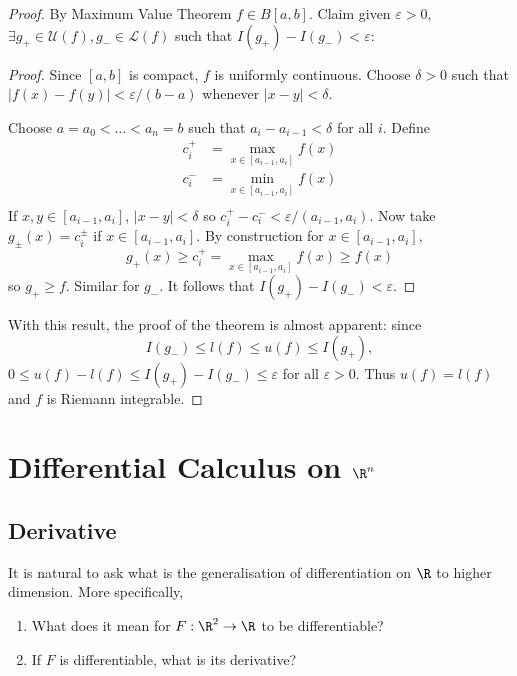 \documentclass[a4paper]{article}
\newcommand*{\riem}[1]{\mathcal{#1}}
\theoremstyle{definition}
\begin{document}
\begin{proof}
  By Maximum Value Theorem \(f \in B[a, b]\). Claim given \(\varepsilon > 0\), \(\exists g_+ \in \riem U(f), g_- \in \riem L(f)\) such that \(I(g_+) - I(g_-) < \varepsilon\):
  \begin{proof}
    Since \([a, b]\) is compact, \(f\) is uniformly continuous. Choose \(\delta > 0 \) such that \(|f(x) - f(y)| < \varepsilon/(b-a)\) whenever \(|x - y| < \delta\).
    
    Choose \(a = a_0 < \dots < a_n = b\) such that \(a_i - a_{i-1} < \delta\) for all \(i\). Define
    \begin{align*}
      c_i^+ &= \max_{x \in [a_{i-1}, a_i]} f(x) \\
      c_i^- &= \min_{x \in [a_{i-1}, a_i]} f(x) \\
    \end{align*}
    If \(x, y \in [a_{i-1}, a_i]\), \(|x - y| < \delta\) so \(c_i^+ - c_i^- < \varepsilon/(a_{i-1}, a_i)\). Now take \(g_\pm(x) = c_i^\pm\) if \(x \in [a_{i-1}, a_i]\). By construction for \(x \in [a_{i-1}, a_i]\),
    \[
      g_+(x) \geq c_i^+ = \max_{x \in [a_{i-1}, a_i]}f(x) \geq f(x)
    \]
    so \(g_+ \geq f\). Similar for \(g_-\). It follows that \(I(g_+) - I(g_-) < \varepsilon\).
  \end{proof}

  With this result, the proof of the theorem is almost apparent: since
  \[
    I(g_-) \leq l(f) \leq u(f) \leq I(g_+),
  \]
  \(0 \leq u(f) - l(f) \leq I(g_+) - I(g_-) \leq \varepsilon\) for all \(\varepsilon > 0\). Thus \(u(f) = l(f)\) and \(f\) is Riemann integrable.
\end{proof}

\section{Differential Calculus on \texorpdfstring{\(\R^n\)}{R\^{}n}}

\subsection{Derivative}

It is natural to ask what is the generalisation of differentiation on \(\R\) to higher dimension. More specifically,

\begin{question}\leavevmode
  \begin{enumerate}
  \item What does it mean for \(F: \R^2 \to \R\) to be differentiable?
  \item If \(F\) is differentiable, what is its derivative?
  \end{enumerate}
\end{question}
\end{document}
